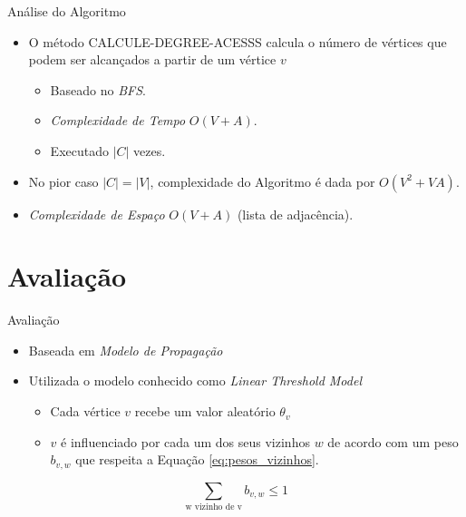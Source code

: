 \documentclass[t,14pt,mathserif,xcolor=table]{beamer}
\begin{document}
\begin{frame}{Análise do Algoritmo}

	\begin{itemize}
		\item O método \textsc{CALCULE-DEGREE-ACESSS}{} calcula o número de vértices que podem ser alcançados a partir de um vértice $v$
		\begin{itemize}
		
			\item Baseado no \textit{BFS}{}.
			\item \textit{Complexidade de Tempo} $O(V+A)${}.
			\item Executado $|C|$ vezes{}.
		
		\end{itemize}

		\item No pior caso $|C| = |V|$, complexidade do Algoritmo é dada por $O(V^{2}+VA)${}.
		
		\item \textit{Complexidade de Espaço} $O(V+A)$ (lista de adjacência){}.
		
	\end{itemize}




\end{frame}


\section{Avaliação}

\begin{frame}{Avaliação}

	\begin{itemize}
		
		\item Baseada em \textit{Modelo de Propagação}
		\item Utilizada o modelo conhecido como \textit{Linear Threshold Model} \cite{granovetter1978threshold, schelling2006micromotives}{}
		\begin{itemize}
			\item Cada vértice $v$ recebe um valor aleatório $\theta_v$
			\item  $v$ é influenciado por cada um dos seus vizinhos $w$ de acordo com um peso $b_{v,w}$ que respeita a Equação \ref{eq:pesos_vizinhos}{}.
		\end{itemize}	
		
	\end{itemize}
	
\begin{equation} \label{eq:pesos_vizinhos}
\sum\limits_{\textrm{w vizinho de v}}{b_{v,w} \leq 1}
\end{equation}


\end{frame}
\end{document}
